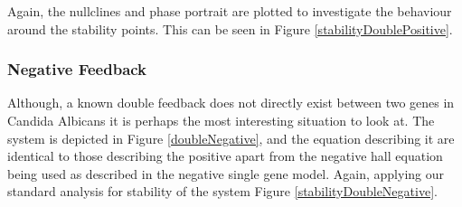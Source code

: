 \documentclass[]{article}
\begin{document}
            Again, the nullclines and phase portrait are plotted to investigate the behaviour around the stability points. This can be seen in Figure \ref{stabilityDoublePositive}.   
\\         
\subsubsection{Negative Feedback}
            Although, a known double feedback does not directly exist between two genes in Candida Albicans it is perhaps the most interesting situation to look at. The system is depicted in Figure \ref{doubleNegative}, and the equation describing it are identical to those describing the positive apart from the negative hall equation being used as described in the negative single gene model. Again, applying our standard analysis for stability of the system Figure \ref{stabilityDoubleNegative}. 
%
%
%
%
%
%
%
\end{document}
